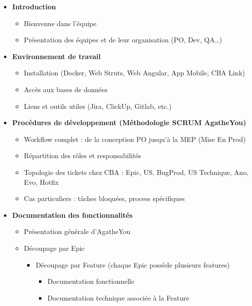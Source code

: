 \documentclass{article}
\begin{document}
\begin{itemize}
    \item \textbf{Introduction}
    \begin{itemize}
        \item Bienvenue dans l'équipe
        \item Présentation des équipes et de leur organisation (PO, Dev, QA…)
    \end{itemize}
    
    \item \textbf{Environnement de travail}
    \begin{itemize}
        \item Installation (Docker, Web Struts, Web Angular, App Mobile, CBA Link)
        \item Accès aux bases de données
        \item Liens et outils utiles (Jira, ClickUp, Gitlab, etc.)
    \end{itemize}
    
    \item \textbf{Procédures de développement (Méthodologie SCRUM AgatheYou)}
    \begin{itemize}
        \item Workflow complet : de la conception PO jusqu'à la MEP (Mise En Prod)
        \item Répartition des rôles et responsabilités
        \item Topologie des tickets chez CBA : Epic, US, BugProd, US Technique, Ano, Evo, Hotfix
        \item Cas particuliers : tâches bloquées, process spécifiques
    \end{itemize}
    
    \item \textbf{Documentation des fonctionnalités}
    \begin{itemize}
        \item Présentation générale d'AgatheYou
        \item Découpage par Epic 
        \begin{itemize}
            \item Découpage par Feature (chaque Epic possède plusieurs features)
            \begin{itemize}
                \item Documentation fonctionnelle
                \item Documentation technique associée à la Feature
            \end{itemize}
        \end{itemize}
    \end{itemize}
    

\end{itemize}
\end{document}

